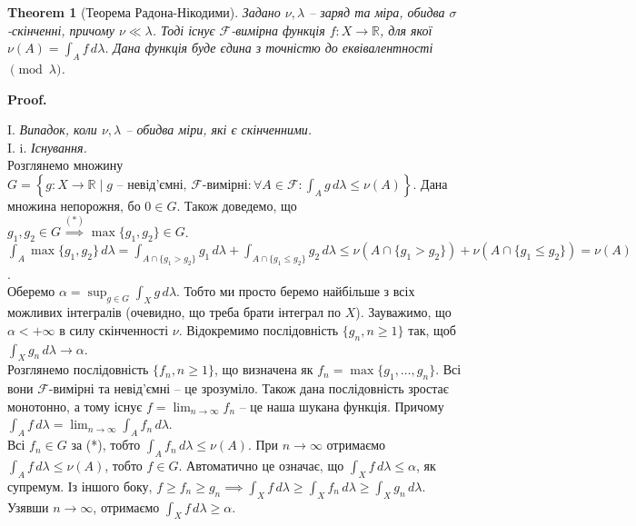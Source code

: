 \documentclass[a4paper, 10pt]{article}
\makeatletter
\theoremstyle{theoremdd}
\newtheorem{theorem}{Theorem}[subsection]
\renewenvironment{proof}[1][Proof.\\]{\par
\pushQED{\hfill \qed}%
\normalfont \topsep6\p@\@plus6\p@\relax
\trivlist
\item\relax
{\bfseries
#1\@addpunct{.}}\hspace\labelsep\ignorespaces
}{%
\popQED\endtrivlist\@endpefalse
}
\makeatother
\begin{document}
\begin{theorem}[Теорема Радона-Нікодими]
Задано $\nu, \lambda$ -- заряд та міра, обидва $\sigma$-скінченні, причому $\nu \ll \lambda$. Тоді існує $\mathcal{F}$-вимірна функція $f \colon X \to \mathbb{R}$, для якої $\nu(A) = \displaystyle\int_A f\,d\lambda$. Дана функція буде єдина з точністю до еквівалентності $\pmod \lambda$.
\end{theorem}

\begin{proof}
I. \textit{Випадок, коли $\nu, \lambda$ -- обидва міри, які є скінченними.}\\
I. i. \textit{Існування.}\\
Розглянемо множину $\displaystyle G = \left\{ g \colon X \to \mathbb{R} \mid g \text{ -- невід'ємні, $\mathcal{F}$-вимірні}: \forall A \in \mathcal{F}: \int_A g\,d\lambda \leq \nu(A) \right\}$. Дана множина непорожня, бо $0 \in G$. Також доведемо, що $g_1,g_2 \in G \overset{(*)}{\implies} \max\{g_1,g_2\} \in G$.\\
$\displaystyle\int_A \max\{g_1,g_2\}\,d\lambda = \int_{A \cap \{g_1 > g_2\}}g_1\,d\lambda + \int_{A \cap \{g_1 \leq g_2\}} g_2\,d\lambda \leq \nu(A \cap \{g_1 > g_2\}) + \nu(A \cap \{g_1 \leq g_2\}) = \nu(A)$.\\
Оберемо $\alpha = \displaystyle\sup_{g \in G} \int_X g\,d\lambda$. Тобто ми просто беремо найбільше з всіх можливих інтегралів (очевидно, що треба брати інтеграл по $X$). Зауважимо, що $\alpha < +\infty$ в силу скінченності $\nu$. Відокремимо послідовність $\{g_n, n \geq 1\}$ так, щоб $\displaystyle\int_X g_n\,d\lambda \to \alpha$.\\
Розглянемо послідовність $\{f_n, n \geq 1\}$, що визначена як $f_n = \max \{g_1,\dots,g_n\}$. Всі вони $\mathcal{F}$-вимірні та невід'ємні -- це зрозуміло. Також дана послідовність зростає монотонно, а тому існує $f = \displaystyle\lim_{n \to \infty} f_n$ -- це наша шукана функція. Причому $\displaystyle\int_A f\,d\lambda = \lim_{n \to \infty} \int_A f_n\,d\lambda$.\\
Всі $f_n \in G$ за (*), тобто $\displaystyle\int_A f_n\,d\lambda \leq \nu(A)$. При $n \to \infty$ отримаємо $\displaystyle\int_A f\,d\lambda \leq \nu(A)$, тобто $f \in G$. Автоматично це означає, що $\displaystyle\int_X f\,d\lambda \leq \alpha$, як супремум. Із іншого боку, $f \geq f_n \geq g_n \implies \displaystyle \int_X f\,d\lambda \geq \int_X f_n\,d\lambda \geq \int_X g_n\,d\lambda$. Узявши $n \to \infty$, отримаємо $\displaystyle\int_X f\,d\lambda \geq \alpha$.\\

\end{proof}
\end{document}
